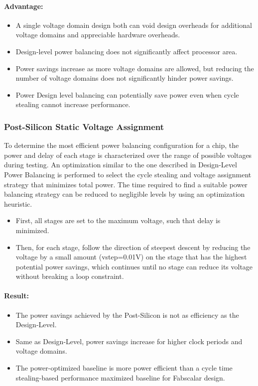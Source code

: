 \documentclass[10pt,a4paper]{article}
\begin{document}
\paragraph{Advantage:}
\begin{itemize}
    \item A single voltage domain design both can void design overheads for additional voltage domains and appreciable hardware overheads.
    \item Design-level power balancing does not significantly affect processor area.
    \item Power savings increase as more voltage domains are allowed, but reducing the number of voltage
    domains does not significantly hinder power savings.
    \item Power Design level balancing can potentially save power even when cycle stealing cannot increase performance.
\end{itemize}
\subsubsection{Post-Silicon Static Voltage Assignment}
To determine the most efficient power balancing configuration for a chip, the power and delay of each stage is characterized over the range of possible voltages during testing. An optimization similar to the one described in Design-Level Power Balancing is performed to select the cycle stealing and voltage assignment strategy that minimizes total power. The time required to find a suitable power balancing strategy can be reduced to negligible levels by using an optimization heuristic.\\
\begin{itemize}
	\item  First, all stages are set to the maximum voltage, such that delay is minimized. 
	\item Then, for each stage, follow the direction of steepest descent by reducing the voltage by a small amount (vstep=0.01V) on the stage that has the highest potential power savings, which continues until no stage can reduce its voltage without breaking a loop constraint. 
\end{itemize}
\paragraph{Result:} 
\begin{itemize}
    \item The power savings achieved by the Post-Silicon is not as efficiency as the Design-Level.
    \item Same as Design-Level, power savings increase for higher clock periods and voltage domains.
    \item  The power-optimized baseline is more power efficient than a cycle time stealing-based performance maximized baseline for Fabscalar design.
\end{itemize}
\end{document}

